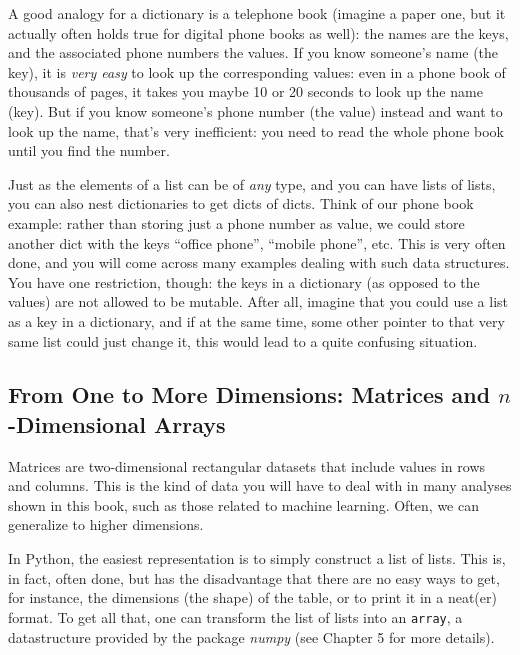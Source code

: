 
A good analogy for a dictionary is a telephone book (imagine a paper
one, but it actually often holds true for digital phone books as
well): the names are the keys, and the associated phone numbers the
values. If you know someone's name (the key), it is \emph{very easy}
to look up the corresponding values: even in a phone book of thousands
of pages, it takes you maybe 10 or 20 seconds to look up the name
(key). But if you know someone's phone number (the value) instead and
want to look up the name, that's very inefficient: you need to read
the whole phone book until you find the number.

Just as the elements of a list can be of \emph{any} type, and you can
have lists of lists, you can also nest dictionaries to get dicts of
dicts. Think of our phone book example: rather than storing just a
phone number as value, we could store another dict with the keys
``office phone'', ``mobile phone'', etc. This is very often done, and you
will come across many examples dealing with such data structures.
You have one restriction, though: the keys in a dictionary (as opposed
to the values) are not allowed to be mutable. After all, imagine that
you could use a list as a key in a dictionary, and if at the same time,
some other pointer to that very same list could just change it, this
would lead to a quite confusing situation.




\subsection{From One to More Dimensions: Matrices and $n$-Dimensional Arrays}\label{sec:matrices}

 Matrices are two-dimensional rectangular datasets that include values
in rows and columns. This is the kind of data you will have to deal
with in many analyses shown in this book, such as those related to
machine learning. Often, we can generalize to higher dimensions.


In Python, the easiest representation is to simply construct a list of
lists. This is, in fact, often done, but has the disadvantage that
there are no easy ways to get, for instance, the dimensions (the
shape) of the table, or to print it in a neat(er) format. To get all
that, one can transform the list of lists into an \verb|array|, a
datastructure provided by the package \emph{numpy} (see Chapter 5 for more details).

